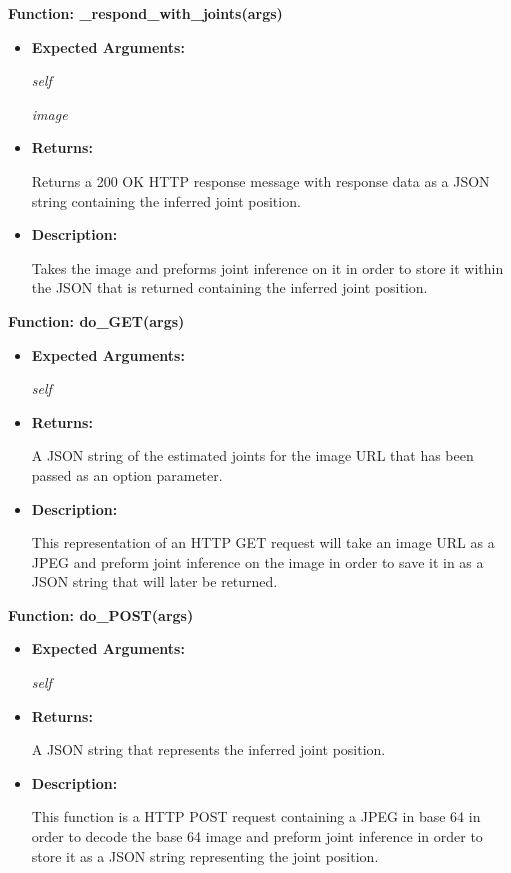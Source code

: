 \documentclass{scrreprt}
\begin{document}
\textbf{Function: \_respond\_with\_joints(args)}
\begin{itemize}
    \item \textbf{Expected Arguments:}

            \quad\textit{self}

            \quad\textit{image}

    \item \textbf{Returns:}

            Returns a 200 OK HTTP response message with response data as a JSON string containing the inferred joint position.

    \item \textbf{Description:}

            Takes the image and preforms joint inference on it in order to store it within the JSON that is returned containing the inferred joint position.

\end{itemize}

\textbf{Function: do\_GET(args)}
\begin{itemize}
    \item \textbf{Expected Arguments:}

           \quad\textit{self}

    \item \textbf{Returns:}

            A JSON string of the estimated joints for the image URL that has been passed as an option parameter.

    \item \textbf{Description:}

            This representation of an HTTP GET request will take an image URL as a JPEG and preform joint inference on the image in order to save it in as a JSON string that will later be returned.

\end{itemize}

\textbf{Function: do\_POST(args)}
\begin{itemize}
    \item \textbf{Expected Arguments:}

            \quad\textit{self}

    \item \textbf{Returns:}

            A JSON string that represents the inferred joint position.

    \item \textbf{Description:}

            This function is a HTTP POST request containing a JPEG in base 64 in order to decode the base 64 image and preform joint inference in order to store it as a JSON string representing the joint position.

\end{itemize}
\end{document}
